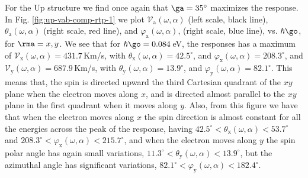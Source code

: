 \documentclass[prb,11pt,tightenlines,twocolumn,aps]{revtex4-1}
\begin{document}
For the Up structure we find once again that  $\ga=35^{\circ}$ maximizes the
response. In Fig. \ref{fig:up-vab-comp-rtp-1} we plot $\mathcal{V}_{\mathrm{a}}
(\omega,\alpha)$ (left scale, black line), $\theta_{\mathrm{a}}
(\omega,\alpha)$ (right scale, red line), and $\varphi_{\mathrm{a}}
(\omega,\alpha)$, (right scale, blue line), vs. $\hbar\go$, for $\rma=x,y$. 
% 
We see that for $\hbar\go=0.084$\,eV, the responses has a maximum of
$\mathcal{V}_{\mathrm{x}} (\omega,\alpha)=431.7$\,Km/s, with
$\theta_{\mathrm{x}}(\omega,\alpha) = 42.5^{\circ}$, and
$\varphi_{\mathrm{x}}(\omega,\alpha) = 208.3^{\circ}$, and
$\mathcal{V}_{\mathrm{y}} (\omega,\alpha)=687.9$\,Km/s, with
$\theta_{\mathrm{y}}(\omega,\alpha) = 13.9^{\circ}$, and
$\varphi_{\mathrm{y}} (\omega,\alpha) = 82.1^{\circ}$. This means that, the
spin is directed upward the third Cartesian quadrant of the $xy$ plane when the
electron moves along $x$, and is directed almost parallel to the $xy$ plane in
the first quadrant when it moves along $y$. 
% 
Also, from this figure we have that when the electron moves along $x$ the spin
direction is almost constant for all the energies across the peak of the
response, having
$42.5^{\circ}<\theta_{\mathrm{x}}(\omega,\alpha)<53.7^{\circ}$ and
$208.3^{\circ}<\varphi_{\mathrm{x}}(\omega,\alpha)<215.7^{\circ}$, and when
the electron moves along $y$ the spin polar angle has again small variations,
$11.3^{\circ}< \theta_{\mathrm{y}}(\omega,\alpha)<13.9^{\circ}$, but the
azimuthal angle has significant variations, $82.1^{\circ}<
\varphi_{\mathrm{y}}(\omega,\alpha)<182.4^{\circ}$.
\end{document}
